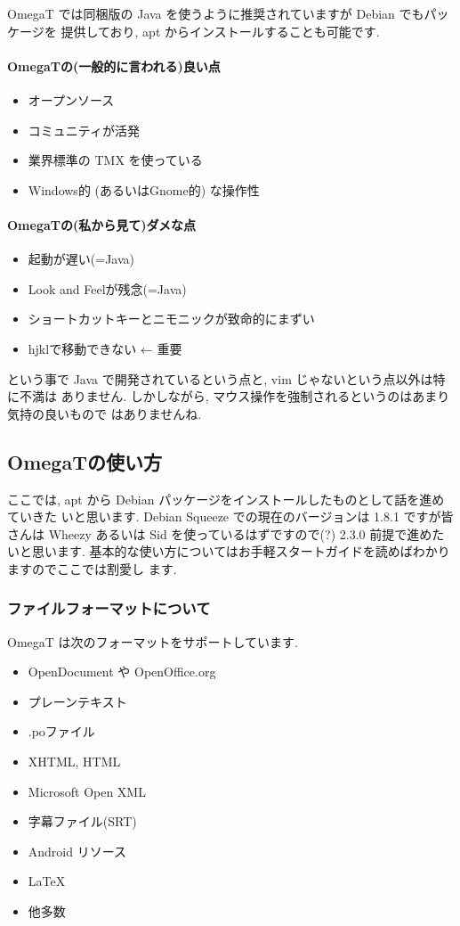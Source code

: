 \documentclass[mingoth,a4paper]{jsarticle}
\begin{document}
OmegaT では同梱版の Java を使うように推奨されていますが Debian でもパッケージを
提供しており, apt からインストールすることも可能です.

\paragraph{OmegaTの(一般的に言われる)良い点}
\begin{itemize}
	\item オープンソース
	\item コミュニティが活発
	\item 業界標準の TMX を使っている
	\item Windows的 (あるいはGnome的) な操作性
\end{itemize}

\paragraph{OmegaTの(私から見て)ダメな点}
\begin{itemize}
	\item 起動が遅い(=Java)
	\item Look and Feelが残念(=Java)
	\item ショートカットキーとニモニックが致命的にまずい
	\item hjklで移動できない ← 重要
\end{itemize}

という事で Java で開発されているという点と, vim じゃないという点以外は特に不満は
ありません. しかしながら, マウス操作を強制されるというのはあまり気持の良いもので
はありませんね.

\subsection{OmegaTの使い方}
ここでは, apt から Debian パッケージをインストールしたものとして話を進めていきた
いと思います. Debian Squeeze での現在のバージョンは 1.8.1 ですが皆さんは Wheezy 
あるいは Sid を使っているはずですので(?) 2.3.0 前提で進めたいと思います.
基本的な使い方についてはお手軽スタートガイドを読めばわかりますのでここでは割愛し
ます.

\subsubsection{ファイルフォーマットについて}

OmegaT は次のフォーマットをサポートしています.
\begin{itemize}
	\item OpenDocument や OpenOffice.org
	\item プレーンテキスト
	\item .poファイル
	\item XHTML, HTML
	\item Microsoft Open XML
	\item 字幕ファイル(SRT)
	\item Android リソース
	\item LaTeX
	\item 他多数
\end{itemize}
\end{document}
